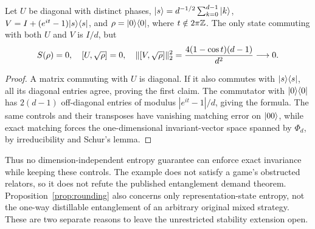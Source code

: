 \begin{proposition}\label{prop:fixed}
Let $U$ be diagonal with distinct phases, $|s\rangle=d^{-1/2}\sum_{k=0}^{d-1}|k\rangle$, $V=I+(e^{it}-1)|s\rangle\langle s|$, and $\rho=|0\rangle\langle0|$, where $t\notin2\pi\mathbb Z$. The only state commuting with both $U$ and $V$ is $I/d$, but
\[
 S(\rho)=0,\quad [U,\sqrt\rho]=0,\quad
 \lVert[V,\sqrt\rho]\rVert_2^2=\frac{4(1-\cos t)(d-1)}{d^2}\longrightarrow0.
\]
\end{proposition}
\begin{proof}
A matrix commuting with $U$ is diagonal. If it also commutes with $|s\rangle\langle s|$, all its diagonal entries agree, proving the first claim. The commutator with $|0\rangle\langle0|$ has $2(d-1)$ off-diagonal entries of modulus $|e^{it}-1|/d$, giving the formula. The same controls and their transposes have vanishing matching error on $|00\rangle$, while exact matching forces the one-dimensional invariant-vector space spanned by $\Phi_d$, by irreducibility and Schur's lemma.
\end{proof}

Thus no dimension-independent entropy guarantee can enforce exact invariance while keeping these controls. The example does not satisfy a game's obstructed relators, so it does not refute the published entanglement demand theorem. Proposition~\ref{prop:rounding} also concerns only representation-state entropy, not the one-way distillable entanglement of an arbitrary original mixed strategy. These are two separate reasons to leave the unrestricted stability extension open.
